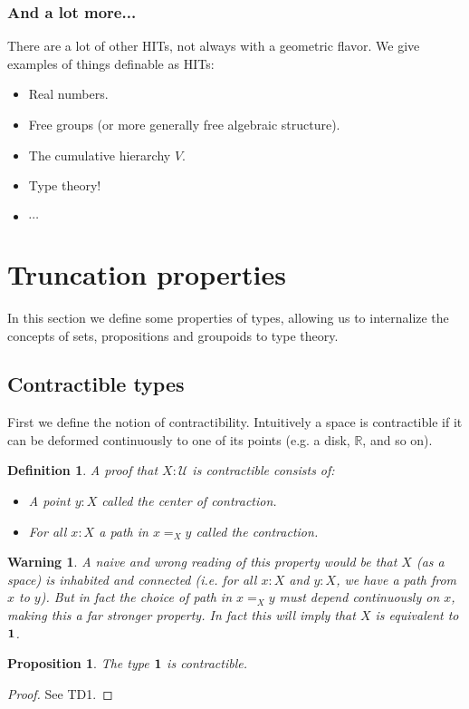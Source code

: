 \documentclass{article}
\newcommand{\se}[1]{\medbreak \medbreak \section{#1}}
\newcommand{\sse}[1]{\medbreak \subsection{#1}}
\newcommand{\ssse}[1]{\subsubsection*{#1}}
\newcommand{\U}{{\mathcal U}}
\newcommand{\one}{{\bf 1}}
\newtheorem{definition}{Definition}
\newtheorem{proposition}{Proposition}
\newtheorem{warning}{\danger Warning}
\begin{document}
\ssse{And a lot more...}

There are a lot of other HITs, not always with a geometric flavor. We give examples of things definable as HITs:
\begin{itemize} 
\item Real numbers.
\item Free groups (or more generally free algebraic structure).
\item The cumulative hierarchy $V$.
\item Type theory!
\item $\cdots$
\end{itemize}




\se{Truncation properties}

In this section we define some properties of types, allowing us to internalize the concepts of sets, propositions and groupoids to type theory.


\sse{Contractible types}

First we define the notion of contractibility. Intuitively a space is contractible if it can be deformed continuously to one of its points (e.g. a disk, $\mathbb{R}$, and so on). %

\begin{definition}
A proof that $X:\U$ is contractible consists of:
\begin{itemize}
\item A point $y:X$ called the \emph{center of contraction}.
\item For all $x:X$ a path in $x=_X y$ called the \emph{contraction}.
\end{itemize}
\end{definition}

\begin{warning}
A naive and wrong reading of this property would be that $X$ (as a space) is inhabited and connected (i.e. for all $x:X$ and $y:X$, we have a path from $x$ to $y$). But in fact the choice of path in $x=_X y$ must depend continuously on $x$, making this a far stronger property. In fact this will imply that $X$ is equivalent to $\one$.
\end{warning}

\begin{proposition}
The type $\one$ is contractible.
\end{proposition}
\begin{proof}
See TD1.
\end{proof}
\end{document}
